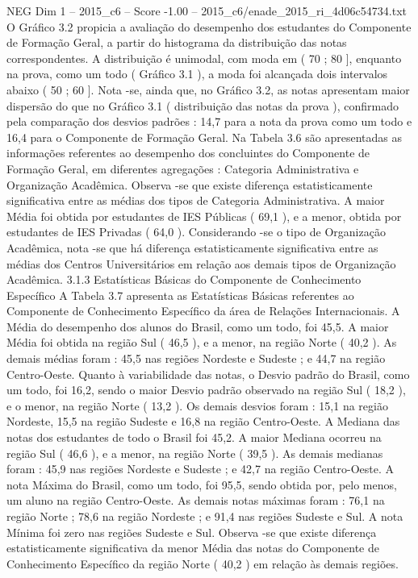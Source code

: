 \begin{textsample}{NEG Dim 1 – 2015\_c6 – Score -1.00 – 2015\_c6/enade\_2015\_ri\_4d06c54734.txt}
O Gráfico 3.2 propicia a avaliação do desempenho dos estudantes do Componente de Formação Geral, a partir do histograma da distribuição das notas correspondentes.
A distribuição é unimodal, com moda em ( 70 ; 80 ], enquanto na prova, como um todo ( Gráfico 3.1 ), a moda foi alcançada dois intervalos abaixo ( 50 ; 60 ].
Nota -se, ainda que, no Gráfico 3.2, as notas apresentam maior dispersão do que no Gráfico 3.1 ( distribuição das notas da prova ), confirmado pela comparação dos desvios padrões : 14,7 para a nota da prova como um todo e 16,4 para o Componente de Formação Geral.
Na Tabela 3.6 são apresentadas as informações referentes ao desempenho dos concluintes do Componente de Formação Geral, em diferentes agregações : Categoria Administrativa e Organização Acadêmica.
Observa -se que existe diferença estatisticamente significativa entre as médias dos tipos de Categoria Administrativa.
A maior Média foi obtida por estudantes de IES Públicas ( 69,1 ), e a menor, obtida por estudantes de IES Privadas ( 64,0 ).
Considerando -se o tipo de Organização Acadêmica, nota -se que há diferença estatisticamente significativa entre as médias dos Centros Universitários em relação aos demais tipos de Organização Acadêmica. 3.1.3 Estatísticas Básicas do Componente de Conhecimento Específico A Tabela 3.7 apresenta as Estatísticas Básicas referentes ao Componente de Conhecimento Específico da área de Relações Internacionais.
A Média do desempenho dos alunos do Brasil, como um todo, foi 45,5.
A maior Média foi obtida na região Sul ( 46,5 ), e a menor, na região Norte ( 40,2 ).
As demais médias foram : 45,5 nas regiões Nordeste e Sudeste ; e 44,7 na região Centro-Oeste.
Quanto à variabilidade das notas, o Desvio padrão do Brasil, como um todo, foi 16,2, sendo o maior Desvio padrão observado na região Sul ( 18,2 ), e o menor, na região Norte ( 13,2 ).
Os demais desvios foram : 15,1 na região Nordeste, 15,5 na região Sudeste e 16,8 na região Centro-Oeste.
A Mediana das notas dos estudantes de todo o Brasil foi 45,2.
A maior Mediana ocorreu na região Sul ( 46,6 ), e a menor, na região Norte ( 39,5 ).
As demais medianas foram : 45,9 nas regiões Nordeste e Sudeste ; e 42,7 na região Centro-Oeste.
A nota Máxima do Brasil, como um todo, foi 95,5, sendo obtida por, pelo menos, um aluno na região Centro-Oeste.
As demais notas máximas foram : 76,1 na região Norte ; 78,6 na região Nordeste ; e 91,4 nas regiões Sudeste e Sul.
A nota Mínima foi zero nas regiões Sudeste e Sul.
Observa -se que existe diferença estatisticamente significativa da menor Média das notas do Componente de Conhecimento Específico da região Norte ( 40,2 ) em relação às demais regiões.

\end{textsample}

